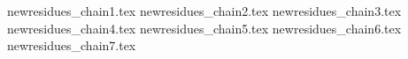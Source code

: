 newresidues_chain1.tex             
newresidues_chain2.tex             
newresidues_chain3.tex             
newresidues_chain4.tex             
newresidues_chain5.tex             
newresidues_chain6.tex             
newresidues_chain7.tex             
